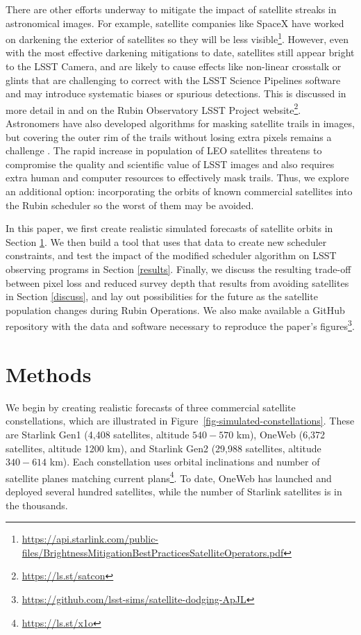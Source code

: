 \documentclass[twocolumn]{aastex631}
\begin{document}
There are other efforts underway to mitigate the impact of satellite streaks in astronomical images. For example, satellite companies like SpaceX have worked on darkening the exterior of satellites so they will be less visible\footnote{\url{https://api.starlink.com/public-files/BrightnessMitigationBestPracticesSatelliteOperators.pdf}}. However, even with the most effective darkening mitigations to date, satellites still appear bright to the LSST Camera, and are likely to cause effects like non-linear crosstalk or glints that are challenging to correct with the LSST Science Pipelines software and may introduce systematic biases or spurious detections. This is discussed in more detail in \citet{tyson20} and on the Rubin Observatory LSST Project website\footnote{\url{https://ls.st/satcon}}. Astronomers have also developed algorithms for masking satellite trails in images, but covering the outer rim of the trails without losing extra pixels remains a challenge \citep{hasan22}. The rapid increase in population of LEO satellites threatens to compromise the quality and scientific value of LSST images and also requires extra human and computer resources to effectively mask trails. Thus, we explore an additional option: incorporating the orbits of known commercial satellites into the Rubin scheduler so the worst of them may be avoided.

In this paper, we first create realistic simulated forecasts of satellite orbits in Section \ref{method}. We then build a tool that uses that data to create new scheduler constraints, and test the impact of the modified scheduler algorithm on LSST observing programs in Section \ref{results}. Finally, we discuss the resulting trade-off between pixel loss and reduced survey depth that results from avoiding satellites in Section \ref{discuss}, and lay out possibilities for the future as the satellite population changes during Rubin Operations. We also make available a GitHub repository with the data and software necessary to reproduce the paper's figures\footnote{\url{https://github.com/lsst-sims/satellite-dodging-ApJL}}.


\section{Methods}\label{method}

We begin by creating realistic forecasts of three commercial satellite constellations, which are illustrated in Figure~\ref{fig-simulated-constellations}. These are Starlink Gen1 (4,408 satellites, altitude $540-570$ km), OneWeb (6,372 satellites, altitude 1200 km), and Starlink Gen2 (29,988 satellites, altitude $340-614$ km). Each constellation uses orbital inclinations and number of satellite planes matching current plans\footnote{\url{https://ls.st/x1o}}. To date, OneWeb has launched and deployed several hundred satellites, while the number of Starlink satellites is in the thousands.
\end{document}
